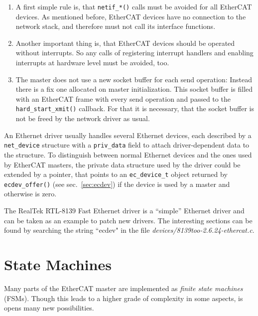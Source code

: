 \documentclass[a4paper,12pt,BCOR6mm,bibtotoc,idxtotoc]{scrbook}
\begin{document}
\begin{enumerate}

\item A first simple rule is, that \lstinline+netif_*()+ calls must be avoided
for all EtherCAT devices. As mentioned before, EtherCAT devices have no
connection to the network stack, and therefore must not call its interface
functions.

\item Another important thing is, that EtherCAT devices should be operated
without interrupts. So any calls of registering interrupt handlers and enabling
interrupts at hardware level must be avoided, too.

\item The master does not use a new socket buffer for each send operation:
Instead there is a fix one allocated on master initialization. This socket
buffer is filled with an EtherCAT frame with every send operation and passed to
the \lstinline+hard_start_xmit()+ callback. For that it is necessary, that the
socket buffer is not be freed by the network driver as usual.

\end{enumerate}

An Ethernet driver usually handles several Ethernet devices, each described by
a \lstinline+net_device+ structure with a \lstinline+priv_data+ field to
attach driver-dependent data to the structure. To distinguish between normal
Ethernet devices and the ones used by EtherCAT masters, the private data
structure used by the driver could be extended by a pointer, that points to an
\lstinline+ec_device_t+ object returned by \lstinline+ecdev_offer()+ (see
sec.~\ref{sec:ecdev}) if the device is used by a master and otherwise is zero.

The RealTek RTL-8139 Fast Ethernet driver is a ``simple'' Ethernet driver and
can be taken as an example to patch new drivers. The interesting sections can
be found by searching the string ``ecdev" in the file
\textit{devices/8139too-2.6.24-ethercat.c}.


\chapter{State Machines}
\label{sec:fsm}

Many parts of the EtherCAT master are implemented as \textit{finite state
machines} (FSMs). Though this leads
to a higher grade of complexity in some aspects, is opens many new
possibilities.
\end{document}
